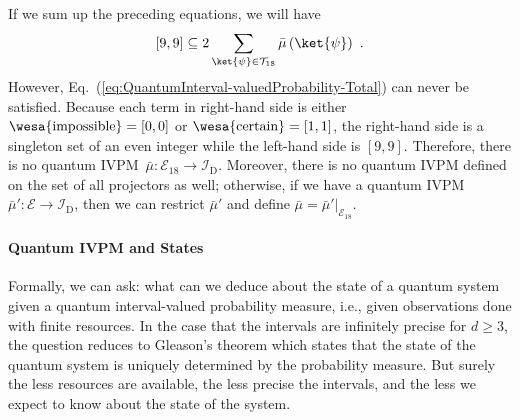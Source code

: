 \documentclass[english,reprint, aps, prl,superscriptaddress, showpacs,
showkeys, longbibliography, amsmath, amssymb]{revtex4-1}
\theoremstyle{plain}
\theoremstyle{definition}
\newcommand{\events}{\ensuremath{\mathcal{E}}}
\newcommand{\imposs}{{\text{\wesa{impossible}}}}
\newcommand{\necess}{{\text{\wesa{certain}}}}
\begin{document}
If we sum up the preceding equations, we will have
\begin{equation}
\left[9,9\right]\subseteq2\sum_{\ket{\psi}\in\mathcal{T}_{18}}\bar{\mu}\left(\ket{\psi}\right)\textrm{ .}\label{eq:QuantumInterval-valuedProbability-Total}
\end{equation}
However, Eq.~(\ref{eq:QuantumInterval-valuedProbability-Total})
can never be satisfied. Because each term in right-hand side is either
$\imposs=\left[0,0\right]$ or $\necess=\left[1,1\right]$, the right-hand
side is a singleton set of an even integer while the left-hand side
is $\left[9,9\right]$. Therefore, there is no quantum IVPM~$\bar{\mu}:\events_{18}\rightarrow\mathscr{I}_{\mathrm{D}}$.
Moreover, there is no quantum IVPM defined on the set of all projectors
as well; otherwise, if we have a quantum IVPM~$\bar{\mu}':\events\rightarrow\mathscr{I}_{\mathrm{D}}$,
then we can restrict $\bar{\mu}'$ and define $\bar{\mu}=\left.\bar{\mu}'\right|_{\events_{18}}$.

\paragraph{Quantum IVPM and States}

Formally, we can ask: what can we deduce about the state of a quantum
system given a quantum interval-valued probability measure, i.e.,
given observations done with finite resources. In the case that the
intervals are infinitely precise for $d\ge3$, the question reduces
to Gleason's theorem which states that the state of the quantum system
is uniquely determined by the probability measure. But surely the
less resources are available, the less precise the intervals, and
the less we expect to know about the state of the system.
\end{document}
